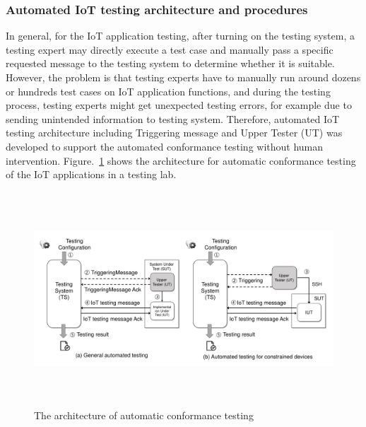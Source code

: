 \subsubsection{Automated IoT testing architecture and procedures}
In general, for the IoT application testing, after turning on the testing system, a testing expert may directly execute a test case and manually pass a specific requested message to the testing system to determine whether it is suitable. However, the problem is that testing experts have to manually run around dozens or hundreds test cases on IoT application functions, and during the testing process, testing experts might get unexpected testing errors, for example due to sending unintended information to testing system. Therefore, automated IoT testing architecture including Triggering message and Upper Tester (UT) was developed to support the automated conformance testing without human intervention. Figure.~\ref{fig:architecture_of_automatic_conf_testing} shows the architecture for automatic conformance testing of the IoT applications in a testing lab.

\begin{figure}[H]
	\centering
	\includegraphics[height=8cm, width=\textwidth]{figures/fig_automated_testing_architecture.pdf}
    \caption{The architecture of automatic conformance testing}
    \label{fig:architecture_of_automatic_conf_testing}
\end{figure}

